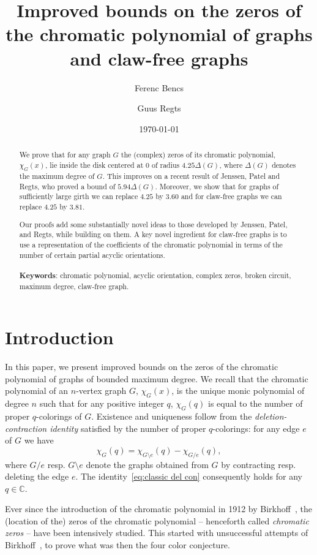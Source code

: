 \documentclass[a4paper,11pt,reqno]{amsart}
\title{Improved bounds on the zeros of the chromatic polynomial of graphs and claw-free graphs}
\author[F. Bencs]{Ferenc Bencs}
\author[G.Regts]{Guus Regts}
\date{\today}
\numberwithin{equation}{section}
\begin{document}
\begin{abstract}
We prove that for any graph $G$ the (complex) zeros of its chromatic polynomial, $\chi_G(x)$, lie inside the disk centered at $0$ of radius $4.25 \Delta(G)$, where $\Delta(G)$ denotes the maximum degree of $G$.
This improves on a recent result of Jenssen, Patel and Regts, who proved a bound of $5.94\Delta(G)$.
Moreover, we show that for graphs of sufficiently large girth we can replace $4.25$ by $3.60$ and for claw-free graphs we can replace $4.25$ by $3.81$.

Our proofs add some substantially novel ideas to those developed by Jenssen, Patel, and Regts, while building on them.
A key novel ingredient for claw-free graphs is to use a representation of the coefficients of the chromatic polynomial in terms of the number of certain partial acyclic orientations.
\\
\quad \\
\footnotesize{{\bf Keywords}: chromatic polynomial, acyclic orientation, complex zeros, broken circuit, maximum degree, claw-free graph.}
\end{abstract}
\maketitle


\section{Introduction}
In this paper, we present improved bounds on the zeros of the chromatic polynomial of graphs of bounded maximum degree.
We recall that the chromatic polynomial of an $n$-vertex graph $G$, $\chi_G(x)$, is the unique monic polynomial of degree $n$ such that for any positive integer $q$, $\chi_G(q)$ is equal to the number of proper $q$-colorings of $G$.
Existence and uniqueness follow from the \emph{deletion-contraction identity} satisfied by the number of proper $q$-colorings: for any edge $e$ of $G$ we have
\begin{equation}\label{eq:classic del con}
    \chi_G(q)=\chi_{G\setminus e}(q)-\chi_{G/e}(q),
\end{equation}
where $G/e$ resp. $G\setminus e$ denote the graphs obtained from $G$ by contracting resp. deleting the edge $e$.
The identity~\eqref{eq:classic del con} consequently holds for any $q\in \mathbb{C}$.

Ever since the introduction of the chromatic polynomial in 1912 by Birkhoff~\cite{Birk}, the (location of the) zeros of the chromatic polynomial -- henceforth called \emph{chromatic zeros} -- have been intensively studied.
This started with unsuccessful attempts of Birkhoff~\cite{Birk}, to prove  what was then the four color conjecture.
\end{document}
